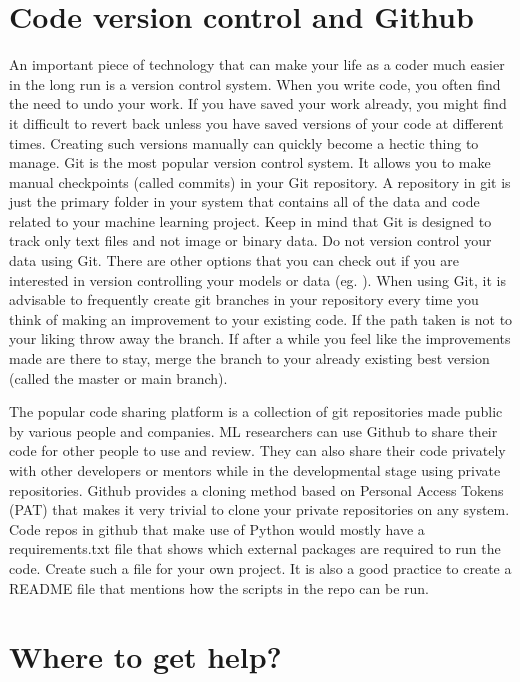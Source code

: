 \documentclass{../template/texnote}
\begin{document}
\section{Code version control and Github}
An important piece of technology that can make your life as a coder much easier in the long run is a version control system. When you write code, you often find the need to undo your work. If you have saved your work already, you might find it difficult to revert back unless you have saved versions of your code at different times. Creating such versions manually can quickly become a hectic thing to manage. Git is the most popular version control system. It allows you to make manual checkpoints (called commits) in your Git repository. A repository in git is just the primary folder in your system that contains all of the data and code related to your machine learning project. Keep in mind that Git is designed to track only text files and not image or binary data. Do not version control your data using Git. There are other options that you can check out if you are interested in version controlling your models or data (eg. \cite{dvc}). When using Git, it is advisable to frequently create git branches in your repository every time you think of making an improvement to your existing code. If the path taken is not to your liking throw away the branch. If after a while you feel like the improvements made are there to stay, merge the branch to your already existing best version (called the master or main branch). 

The popular code sharing platform \cite{github} is a collection of git repositories made public by various people and companies. ML researchers can use Github to share their code for other people to use and review. They can also share their code privately with other developers or mentors while in the developmental stage using private repositories. Github provides a cloning method based on Personal Access Tokens (PAT) that makes it very trivial to clone your private repositories on any system. Code repos in github that make use of Python would mostly have a requirements.txt file that shows which external packages are required to run the code. Create such a file for your own project. It is also a good practice to create a README file that mentions how the scripts in the repo can be run. 
\section{Where to get help?}
\end{document}
